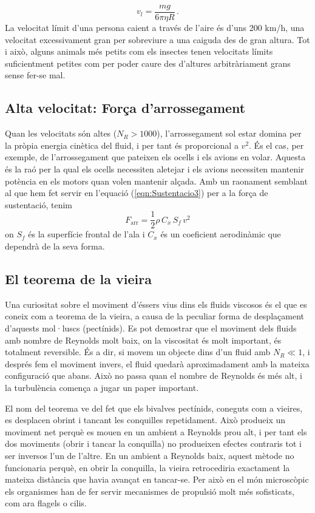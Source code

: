 \documentclass[12pt]{book}
\begin{document}
%
\begin{equation}
    v_l = \frac{m g}{6 \pi \eta R}\, .
\end{equation}
%
La velocitat límit d'una persona caient a través de l'aire és d'uns 200 km/h, una velocitat excessivament gran per sobreviure a una caiguda des de gran altura. Tot i això, alguns animals més petits com els insectes tenen velocitats límits suficientment petites com per poder caure des d'altures arbitràriament grans sense fer-se mal.

\subsection{Alta velocitat: Força d’arrossegament}

Quan les velocitats són altes ($N_R > 1000$), l'arrossegament sol estar domina per la pròpia energia cinètica del fluid, i per tant és proporcional a $v^2$. És el cas, per exemple, de l'arrossegament que pateixen els ocells i els avions en volar. Aquesta és la raó per la qual els ocells necessiten aletejar i els avions necessiten mantenir potència en els motors quan volen mantenir alçada. Amb un raonament semblant al que hem fet servir en l'equació (\ref{eqn:Sustentacio3}) per a la força de sustentació, tenim
%
\begin{equation}
    \boxed{F_\text{arr} = \frac12 \rho \, C_x \,  S_f \, v^2 }
    \label{eqn:Sustentacio3}
\end{equation}
%
on $S_f$ és la superfície frontal de l'ala i $C_x$ és un coeficient aerodinàmic que dependrà de la seva forma.

\subsection{El teorema de la vieira}

Una curiositat sobre el moviment d'éssers vius dins els fluids viscosos és el que es coneix com a teorema de la vieira, a causa de la peculiar forma de desplaçament d'aquests mol·luscs (pectínids). Es pot demostrar que el moviment dels fluids amb nombre de Reynolds molt baix, on la viscositat és molt important, és totalment reversible. És a dir, si movem un objecte dins d'un fluid amb $N_R \ll 1$, i després fem el moviment invers, el fluid quedarà aproximadament amb la mateixa configuració que abans. Això no passa quan el nombre de Reynolds és més alt, i la turbulència comença a jugar un paper important.

El nom del teorema ve del fet que els bivalves pectínids, coneguts com a vieires, es desplacen obrint i tancant les conquilles repetidament. Això produeix un moviment net perquè es mouen en un ambient a Reynolds prou alt, i per tant els dos moviments (obrir i tancar la conquilla) no produeixen efectes contraris tot i ser inversos l'un de l'altre. En un ambient a Reynolds baix, aquest mètode no funcionaria perquè, en obrir la conquilla, la vieira retrocediria exactament la mateixa distància que havia avançat en tancar-se. Per això en el món microscòpic els organismes han de fer servir mecanismes de propulsió molt més sofisticats, com ara flagels o cilis.
\end{document}
